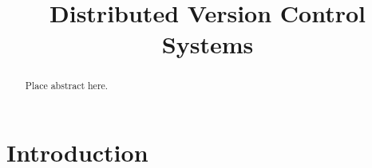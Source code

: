 \documentclass{article}
\title{Distributed Version Control Systems}
\begin{document}
\maketitle

\begin{abstract}
 Place abstract here.
\end{abstract}


\section{Introduction}

%
%
%
\end{document}
